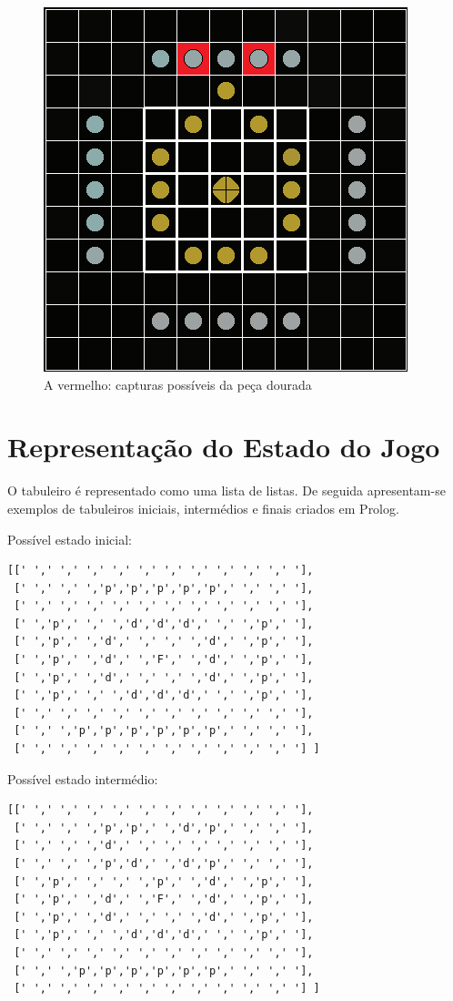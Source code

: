 \documentclass[a4paper]{article}
\begin{document}
\begin{figure}
\centering
\includegraphics[scale=1]{Breakthru_capture.png}
\caption{A vermelho: capturas possíveis da peça dourada}
\label{fig:moves}
\end{figure}



\section{Representação do Estado do Jogo}
O tabuleiro é representado como uma lista de listas. De seguida apresentam-se  exemplos de tabuleiros iniciais, intermédios e finais criados em Prolog.

Possível estado inicial:

\begin{verbatim}
[[' ',' ',' ',' ',' ',' ',' ',' ',' ',' ',' '],
 [' ',' ',' ','p','p','p','p','p',' ',' ',' '],
 [' ',' ',' ',' ',' ',' ',' ',' ',' ',' ',' '],
 [' ','p',' ',' ','d','d','d',' ',' ','p',' '],
 [' ','p',' ','d',' ',' ',' ','d',' ','p',' '],
 [' ','p',' ','d',' ','F',' ','d',' ','p',' '],
 [' ','p',' ','d',' ',' ',' ','d',' ','p',' '],
 [' ','p',' ',' ','d','d','d',' ',' ','p',' '],
 [' ',' ',' ',' ',' ',' ',' ',' ',' ',' ',' '],
 [' ',' ','p','p','p','p','p','p',' ',' ',' '],
 [' ',' ',' ',' ',' ',' ',' ',' ',' ',' ',' '] ]
\end{verbatim}

Possível estado intermédio:
\begin{verbatim}
[[' ',' ',' ',' ',' ',' ',' ',' ',' ',' ',' '],
 [' ',' ',' ','p','p',' ','d','p',' ',' ',' '],
 [' ',' ',' ','d',' ',' ',' ',' ',' ',' ',' '],
 [' ',' ',' ','p','d',' ','d','p',' ',' ',' '],
 [' ','p',' ',' ',' ','p',' ','d',' ','p',' '],
 [' ','p',' ','d',' ','F',' ','d',' ','p',' '],
 [' ','p',' ','d',' ',' ',' ','d',' ','p',' '],
 [' ','p',' ',' ','d','d','d',' ',' ','p',' '],
 [' ',' ',' ',' ',' ',' ',' ',' ',' ',' ',' '],
 [' ',' ','p','p','p','p','p','p',' ',' ',' '],
 [' ',' ',' ',' ',' ',' ',' ',' ',' ',' ',' '] ]
\end{verbatim}
\end{document}
